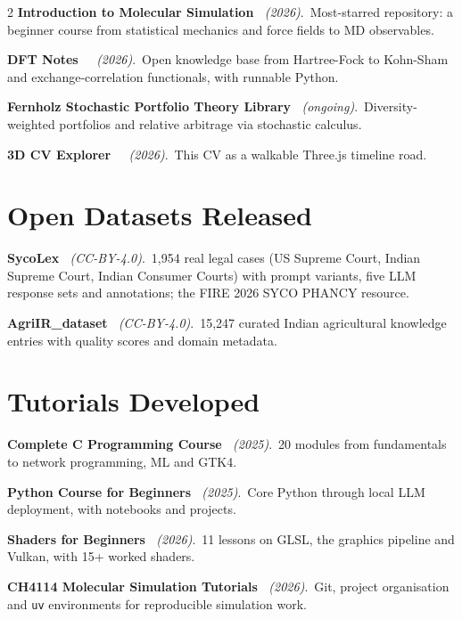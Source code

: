 \documentclass[a4paper,10.5pt]{extarticle}
\newcommand{\proj}[3]{{\small\textbf{#1}~{\itshape\textcolor{mutedtext}{(#2)}}.\ #3}\par\vspace{2.8pt}}
\begin{document}
\begin{paracol}{2}
\proj{Introduction to Molecular Simulation \href{https://github.com/Shuvam-Banerji-Seal/introduction-to-molecular-simulation}{\faGithub}}{2026}{Most-starred repository: a beginner course from statistical mechanics and force fields to MD observables.}

\proj{DFT Notes \href{https://github.com/Shuvam-Banerji-Seal/DFT-notes}{\faGithub}~\href{https://shuvam-banerji-seal.github.io/DFT-notes/}{\faGlobe}}{2026}{Open knowledge base from Hartree-Fock to Kohn-Sham and exchange-correlation functionals, with runnable Python.}

\proj{Fernholz Stochastic Portfolio Theory Library \href{https://github.com/XAheli/Fernholz-SPT}{\faGithub}}{ongoing}{Diversity-weighted portfolios and relative arbitrage via stochastic calculus.}

\proj{3D CV Explorer \href{https://github.com/Shuvam-Banerji-Seal/My-CV}{\faGithub}~\href{https://shuvam-banerji-seal.github.io/My-CV/}{\faGlobe}}{2026}{This CV as a walkable Three.js timeline road.}

\section{Open Datasets Released}

\proj{SycoLex \href{https://huggingface.co/datasets/ShuvBan/SycoLex}{\faDatabase}}{CC-BY-4.0}{1,954 real legal cases (US Supreme Court, Indian Supreme Court, Indian Consumer Courts) with prompt variants, five LLM response sets and annotations; the FIRE 2026 SYCO PHANCY resource.}

\proj{AgriIR\_dataset \href{https://huggingface.co/datasets/ShuvBan/AgriIR_dataset}{\faDatabase}}{CC-BY-4.0}{15,247 curated Indian agricultural knowledge entries with quality scores and domain metadata.}

\section{Tutorials Developed}

\proj{Complete C Programming Course \href{https://github.com/Shuvam-Banerji-Seal/C-Programming-for-Beginners}{\faGithub}}{2025}{20 modules from fundamentals to network programming, ML and GTK4.}

\proj{Python Course for Beginners \href{https://github.com/Shuvam-Banerji-Seal/Python-Course-for-Beginners}{\faGithub}}{2025}{Core Python through local LLM deployment, with notebooks and projects.}

\proj{Shaders for Beginners \href{https://github.com/Shuvam-Banerji-Seal/shaders-for-beginners}{\faGithub}}{2026}{11 lessons on GLSL, the graphics pipeline and Vulkan, with 15+ worked shaders.}

\proj{CH4114 Molecular Simulation Tutorials \href{https://github.com/Shuvam-Banerji-Seal/CH4114_Molecular_Simulation_Tutorials}{\faGithub}}{2026}{Git, project organisation and \texttt{uv} environments for reproducible simulation work.}

\end{paracol}
\end{document}
